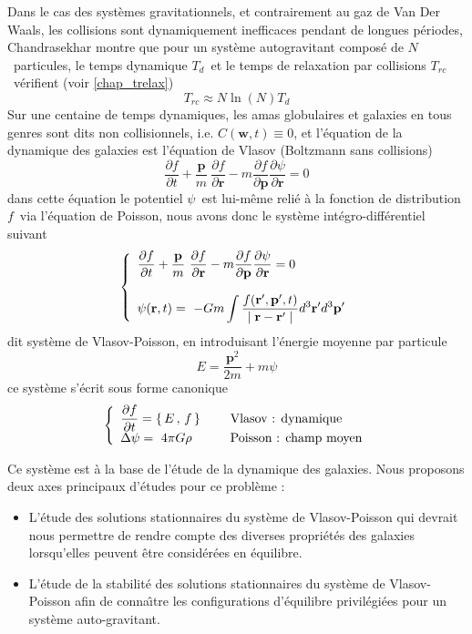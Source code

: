 {Dans le cas des syst\`{e}mes gravitationnels, et contrairement au gaz de Van
Der Waals, les {collision}s sont dynamiquement inefficaces pendant de longues
p\'{e}riodes, {Chandrasekhar} montre que pour un syst\`{e}me autogravitant
compos\'{e} de }$N${\ par\-ti\-cu\-les, le temps dynamique }$T_{d}${\ et le
temps de relaxation par {collision}s }$T_{rc}${\ v\'{e}rifient (voir
\ref{chap_trelax})}
\[
T_{rc}\approx N\ln\left(  N\right)  T_{d}%
\]
{Sur une centaine de temps dynamiques, les amas {globulaire}s et {galaxie}s en
tous genres sont dits non {collision}nels, i.e. }$C\left(  \mathbf{w}%
,t\right)  \equiv0${, et l'\'{e}quation de la dynamique des {galaxie}s est
l'\'{e}quation de {Vlasov} ({Boltzmann} sans {collision}s)}
\[
\dfrac{\partial f}{\partial t}+\dfrac{\mathbf{p}}{m}\ \dfrac{\partial
f}{\partial\mathbf{r}}-m\dfrac{\partial f}{\partial\mathbf{p}}\dfrac
{\partial\psi}{\partial\mathbf{r}}=0
\]
{dans cette \'{e}quation le {potentiel} }$\psi${\ est lui-m\^{e}me reli\'{e}
\`{a} la fonction de distribution }$f${\ via l'\'{e}quation de {Poisson}, nous
avons donc le syst\`{e}me int\'{e}gro-diff\'{e}rentiel suivant }
\[
\left\{
\begin{array}
[c]{l}%
\dfrac{\partial f}{\partial t}+\dfrac{\mathbf{p}}{m}\ \dfrac{\partial
f}{\partial\mathbf{r}}-m\dfrac{\partial f}{\partial\mathbf{p}}\dfrac
{\partial\psi}{\partial\mathbf{r}}=0\\
\\
\psi(\mathbf{r},t\mathbf{)}=~-Gm\displaystyle\int\dfrac{f(\mathbf{r}^{\prime
},\mathbf{p}^{\prime},t)}{\mid\mathbf{r}-\mathbf{r}^{\prime}\mid}%
d^{3}\mathbf{r}^{\prime}d^{3}\mathbf{p}^{\prime}%
\end{array}
\right.
\]
{dit syst\`{e}me de {Vlasov}-{Poisson}, en introduisant l'\'{e}nergie
{moyen}ne par particule }
\[
E=\frac{\mathbf{p}^{2}}{2m}+m\psi
\]
{ce syst\`{e}me s'\'{e}crit sous forme {canonique} }
\[
\left\{
\begin{array}
[c]{lll}%
\dfrac{\partial f}{\partial t}=\left\{  \,E\,,\,f\,\right\}   &  &
\text{{\ {Vlasov} : dynamique}}\\
\Delta\psi=~4\pi G\rho &  & \text{{\ {Poisson} : champ {moyen}}}%
\end{array}
\right.
\]


{Ce syst\`{e}me est \`{a} la base de l'\'{e}tude de la dynamique des
{galaxie}s. Nous proposons deux axes principaux d'\'{e}tudes pour ce
probl\`{e}me : }

\begin{itemize}
\item {L'\'{e}tude des solutions stationnaires du syst\`{e}me de
{Vlasov}-{Poisson} qui devrait nous permettre de rendre compte des diverses
propri\'{e}t\'{e}s des {galaxie}s lorsqu'elles peuvent \^{e}tre
consid\'{e}r\'{e}es en \'{e}quilibre. }

\item {L'\'{e}tude de la stabilit\'{e} des solutions stationnaires du
syst\`{e}me de {Vlasov}-{Poisson} afin de conna\^{\i}tre les configurations
d'\'{e}quilibre privil\'{e}gi\'{e}es pour un syst\`{e}me auto-gravitant. }
\end{itemize}


